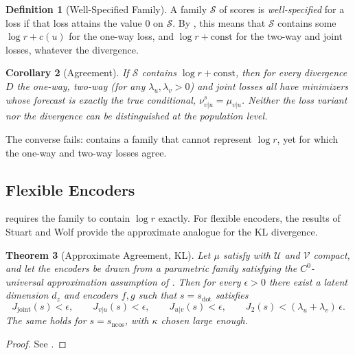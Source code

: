 \documentclass[11pt]{article}
\theoremstyle{plain}
\newtheorem{theorem}{Theorem}[section]
\newtheorem{corollary}[theorem]{Corollary}
\theoremstyle{definition}
\newtheorem{definition}[theorem]{Definition}
\theoremstyle{remark}
\newcommand{\UU}{\mathcal{U}}
\newcommand{\VV}{\mathcal{V}}
\newcommand{\sdot}{s_{\mathrm{dot}}}
\newcommand{\sncos}{s_{\mathrm{ncos}}}
\newcommand{\Jvu}{J_{v\vert u}}
\newcommand{\Juv}{J_{u\vert v}}
\newcommand{\Jtwo}{J_{2}}
\newcommand{\Jjoint}{J_{\mathrm{joint}}}
\begin{document}
\begin{definition}[Well-Specified Family]
 \label{def:wellspecified}
 A family $\mathcal{S}$ of scores is \emph{well-specified} for a loss if that
 loss attains the value $0$ on $\mathcal{S}$. By , this means
 that $\mathcal{S}$ contains some $\log r+c(u)$ for the one-way loss, and
 $\log r+\mathrm{const}$ for the two-way and joint losses, whatever the
 divergence.
\end{definition}

\begin{corollary}[Agreement]
 \label{cor:agreement}
 If $\mathcal{S}$ contains $\log r+\mathrm{const}$, then for every divergence
 $D$ the one-way, two-way (for any $\lambda_u,\lambda_v>0$) and joint losses
 all have minimizers whose forecast is exactly the true conditional,
 $\nu^{s}_{v\vert u}=\mu_{v\vert u}$. Neither the loss variant nor the
 divergence can be distinguished at the population level.
\end{corollary}

The converse fails:  contains a family that cannot
represent $\log r$, yet for which the one-way and two-way losses agree.

\subsection{Flexible Encoders}
\label{ssec:flexible}

 requires the family to contain $\log r$ exactly. For
flexible encoders, the results of Stuart and Wolf provide the approximate
analogue for the KL divergence.

\begin{theorem}[Approximate Agreement, KL]
 \label{thm:approxagreement}
 Let $\mu$ satisfy  with $\UU$ and $\VV$ compact, and let
 the encoders be drawn from a parametric family satisfying the
 $C^0$-universal approximation assumption of
 \cite[Sec.~3]{stuart2026expressivity}. Then for every $\epsilon>0$
 there exist a latent dimension $d_z$ and encoders $f,g$ such that
 $s=\sdot$ satisfies
 \begin{equation*}
  \Jjoint(s)<\epsilon,\qquad\Jvu(s)<\epsilon,\qquad\Juv(s)<\epsilon,
  \qquad\Jtwo(s)<(\lambda_u+\lambda_v)\,\epsilon.
 \end{equation*}
 The same holds for $s=\sncos$, with $\kappa$ chosen large enough.
\end{theorem}
\begin{proof}
 See .
\end{proof}
\end{document}
